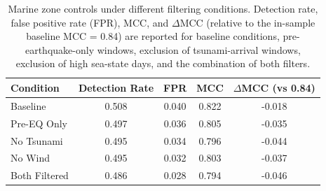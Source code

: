 \documentclass[preprint,review,12pt,authoryear]{elsarticle}
\providecommand{\DIFaddbeginFL}{} %
\newcommand{\DIFaddincludegraphics}[2][]{{\color{blue}\fbox{\DIFOincludegraphics[#1]{#2}}}} %
\DeclareRobustCommand{\DIFaddbeginFL}{\DIFOaddbeginFL \let\includegraphics\DIFaddincludegraphics} %
\begin{document}
\begin{table}[p]
\footnotesize
\centering
\caption{Marine zone controls under different filtering conditions. Detection rate, false positive rate (FPR), MCC, and $\Delta$MCC (relative to the in-sample baseline MCC = 0.84) are reported for baseline conditions, pre-earthquake-only windows, exclusion of tsunami-arrival windows, exclusion of high sea-state days, and the combination of both filters.}
\label{tab:tableS3}
\begin{tabular}{@{}lcccc@{}}
\toprule
Condition      & Detection Rate & FPR   & MCC   & $\Delta$MCC (vs 0.84) \\
\midrule
Baseline       & 0.508          & 0.040 & 0.822 & -0.018                \\
Pre-EQ Only    & 0.497          & 0.036 & 0.805 & -0.035                \\
No Tsunami     & 0.495          & 0.034 & 0.796 & -0.044                \\
No Wind        & 0.495          & 0.032 & 0.803 & -0.037                \\
Both Filtered  & 0.486          & 0.028 & 0.794 & -0.046                \\
\bottomrule
\end{tabular}
\end{table}
\clearpage

\begin{table}[p]
\footnotesize
\centering
\caption{Stratified performance (2$\times$2) by magnitude and depth for M$\ge$7.0 earthquakes. We report MCC and FPR with 95\% confidence intervals (CI). $\Delta$ values are computed relative to the overall mean (window-weighted) performance (MCC = 0.804; FPR = 0.038).}
\label{tab:tableS4}
\DIFaddbeginFL \end{table}
\clearpage
\end{document}
